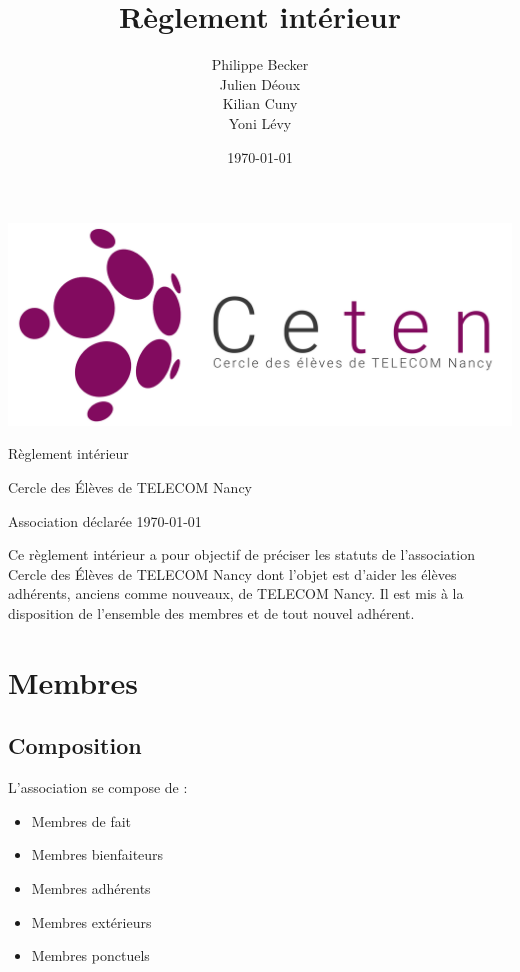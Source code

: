 \documentclass{article} %
\title{Règlement intérieur}
\author{Philippe Becker \\
	Julien Déoux \\
	Kilian Cuny \\
	Yoni Lévy}
\date\today
\begin{document}

	
	\begin{titlepage}
		\begin{center}
			\includegraphics[width=\textwidth]{images/ceten.png}\par
			\vspace{3cm}
			{\Huge \light Règlement intérieur}\par
			\vfill
			{\large Cercle des Élèves de TELECOM Nancy}\par
			{\large \light Association déclarée}
			\vfill
			{\light \today}\par
		\end{center}
	\end{titlepage}


	\begin{center}
		{\light Ce règlement intérieur a pour objectif de préciser les statuts
		de l’association Cercle des Élèves de TELECOM Nancy dont l’objet est
		d’aider les élèves adhérents, anciens comme nouveaux, de TELECOM Nancy.
		Il est mis à la disposition de l’ensemble des membres et de tout nouvel
		adhérent.}
	\end{center}

	\section{Membres}
		
		\subsection{Composition}
			
			L’association se compose de :
			\begin{itemize}
				\item Membres de fait
				\item Membres bienfaiteurs
				\item Membres adhérents
				\item Membres extérieurs
				\item Membres ponctuels
			\end{itemize}
\end{document}
